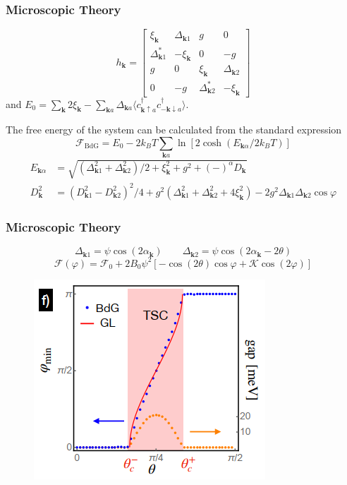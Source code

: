 \documentclass{beamer}
\begin{document}
\begin{frame}
\frametitle{Microscopic Theory}
\begin{equation}
h_\mathbf{k}=\left[
\begin{array}{cccc}
\xi_\mathbf{k}&\Delta_{\mathbf{k}1}&g&0\\
\Delta_{\mathbf{k}1}^*&-\xi_\mathbf{k}&0&-g\\
g&0&\xi_\mathbf{k}&\Delta_{\mathbf{k}2}\\
0&-g&\Delta_{\mathbf{k}2}^*&-\xi_\mathbf{k}
\end{array}
\right]
\end{equation}
and $E_0=\sum_\mathbf{k}2\xi_\mathbf{k}-\sum_{\mathbf{k}a}\Delta_{\mathbf{k}a}\langle c^\dagger_{\mathbf{k}\uparrow a}c^\dagger_{-\mathbf{k}\downarrow a} \rangle$.

The free energy of the system
can be calculated from the standard expression
\begin{equation}
\mathcal{F}_{\mathrm{BdG}}=E_0-2k_BT\sum_{\mathbf{k}a}\ln \left[2\cosh(E_{\mathbf{k}\alpha}/2k_BT)\right]
\end{equation}
\begin{equation}
\begin{aligned}
E_{\mathbf{k}\alpha}&=\sqrt{(\Delta^2_{\mathbf{k}1}+\Delta^2_{\mathbf{k}2})/2+\xi^2_{\mathbf{k}}+g^2+(-)^\alpha D_\mathbf{k}}\\
D^2_\mathbf{k}&=(D^2_{\mathbf{k}1}-D^2_{\mathbf{k}2})^2/4+g^2(\Delta^2_{\mathbf{k}1}+\Delta^2_{\mathbf{k}2}+4\xi^2_\mathbf{k})-2g^2\Delta_{\mathbf{k}1}\Delta_{\mathbf{k}2}\cos\varphi
\end{aligned}
\end{equation}
\end{frame}
\begin{frame}
\frametitle{Microscopic Theory}
\begin{equation}
\Delta_{\mathbf{k}1}=\psi\cos(2\alpha_\mathbf{k})\qquad \Delta_{\mathbf{k}2}=\psi\cos(2\alpha_\mathbf{k}-2\theta)
\end{equation}
\begin{equation}
\mathcal{F}(\varphi)=\mathcal{F}_0+2B_0\psi^2\left[-\cos(2\theta)\cos\varphi+\mathcal{K}\cos(2\varphi)\right]
\end{equation}
\begin{figure}
\centering
\includegraphics[scale=0.8]{pic/p6.png}
\end{figure}
\end{frame}
\end{document}
